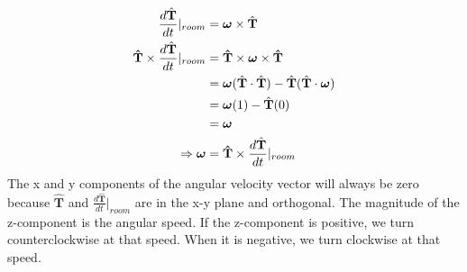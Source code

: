 \documentclass[M3_Night2_Solutions]{subfiles}
\begin{document}


\begin{align}
\frac{d\hat{\mathbf{T}}}{dt}|_{room} &= \boldsymbol \omega \times \hat{\mathbf{T}} \nonumber \\
\mathbf{\hat{T}} \times \frac{d\hat{\mathbf{T}}}{dt}|_{room} &= \mathbf{\hat{T}} \times \boldsymbol \omega \times \mathbf{\hat{T}} \nonumber \\
&= \boldsymbol \omega (\hat{\mathbf{T}} \cdot \hat{\mathbf{T}} ) - \hat{\mathbf{T}} (\hat{\mathbf{T}} \cdot \boldsymbol \omega) \nonumber \\
&= \boldsymbol \omega (1) - \hat{\mathbf{T}} (0) \nonumber \\
&=  \boldsymbol \omega \nonumber \\
\Rightarrow \boldsymbol \omega &= \mathbf{\hat{T}} \times \frac{d\hat{\mathbf{T}}}{dt}|_{room}
\end{align}
The x and y components of the angular velocity vector will always be zero because $\hat{\mathbf{T}}$ and $\frac{d\hat{\mathbf{T}}}{dt}|_{room}$ are in the x-y plane and orthogonal.  The magnitude of the z-component is the angular speed.  If the z-component is positive, we turn counterclockwise at that speed.  When it is negative, we  turn clockwise at that speed.
\end{document}
